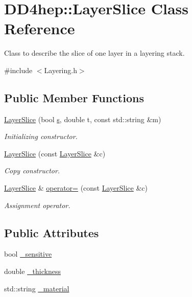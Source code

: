 \hypertarget{class_d_d4hep_1_1_layer_slice}{
\section{DD4hep::LayerSlice Class Reference}
\label{class_d_d4hep_1_1_layer_slice}
}


Class to describe the slice of one layer in a layering stack.  


{\ttfamily \#include $<$Layering.h$>$}\subsection*{Public Member Functions}
\begin{DoxyCompactItemize}
\item 
\hyperlink{class_d_d4hep_1_1_layer_slice_ae70daa0af493afe9ff51032df8f1a5ca}{LayerSlice} (bool \hyperlink{_volumes_8cpp_a17ca6bfc8040d695d3cada22a4763d40}{s}, double t, const std::string \&m)
\begin{DoxyCompactList}\small\item\em Initializing constructor. \item\end{DoxyCompactList}\item 
\hyperlink{class_d_d4hep_1_1_layer_slice_a9701e10d9e18e708c9f2664149e764fa}{LayerSlice} (const \hyperlink{class_d_d4hep_1_1_layer_slice}{LayerSlice} \&c)
\begin{DoxyCompactList}\small\item\em Copy constructor. \item\end{DoxyCompactList}\item 
\hyperlink{class_d_d4hep_1_1_layer_slice}{LayerSlice} \& \hyperlink{class_d_d4hep_1_1_layer_slice_a1470bda72281650117b371db0efe485a}{operator=} (const \hyperlink{class_d_d4hep_1_1_layer_slice}{LayerSlice} \&c)
\begin{DoxyCompactList}\small\item\em Assignment operator. \item\end{DoxyCompactList}\end{DoxyCompactItemize}
\subsection*{Public Attributes}
\begin{DoxyCompactItemize}
\item 
bool \hyperlink{class_d_d4hep_1_1_layer_slice_a0fd1f573e7323cd250cf874aca8e2575}{\_\-sensitive}
\item 
double \hyperlink{class_d_d4hep_1_1_layer_slice_ab67de3b92d55a6b6169a310c9f18d326}{\_\-thickness}
\item 
std::string \hyperlink{class_d_d4hep_1_1_layer_slice_a32cd34749a18cc5d57c7a1546f5399fd}{\_\-material}
\end{DoxyCompactItemize}


